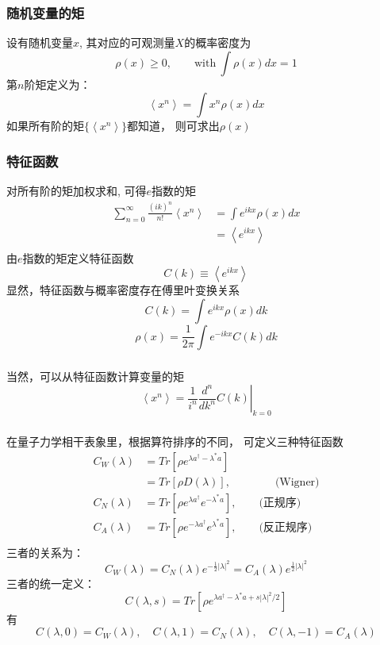   \begin{frame} 
  \frametitle{随机变量的矩}
      设有随机变量$x$, 其对应的可观测量$X$的概率密度为
      \[ \rho (x) \ge 0, \qquad \text{with} ~ \int \rho (x) dx =1\]
      第$n$阶矩定义为：
      \[ \left\langle x^n \right\rangle =  \int x^n \rho (x) dx \]
      如果所有阶的矩$\{\left\langle x^n \right\rangle \}$都知道， 则可求出$\rho (x)$
  \end{frame}

  \begin{frame} 
  \frametitle{特征函数}
     对所有阶的矩加权求和, 可得$e$指数的矩
     \[ \begin{aligned}
      \sum _{n=0} ^ \infty  \frac{(ik)^n}{n!} \left\langle x^n \right\rangle &= \int e^{ikx} \rho (x) dx\\
      &= \left\langle e^{ikx} \right\rangle\\
     \end{aligned}\] 
     由$e$指数的矩定义特征函数
     \[ C(k) \equiv \left\langle e^{ikx} \right\rangle\]
     显然，特征函数与概率密度存在傅里叶变换关系
     \[C (k) = \int e^{ikx} \rho (x) dk \]
     \[\rho (x) = \frac{1}{2 \pi}\int e^{-ikx} C (k) dk \]
  \end{frame}

  \begin{frame} 
  \frametitle{}
     当然，可以从特征函数计算变量的矩
     \[ \left\langle x^n \right\rangle = \left.\frac{1}{i^n} \frac{d^n }{d k^n} C(k)\right|_{k=0} \]
  \end{frame}

  \begin{frame} 
  \frametitle{}
     在量子力学相干表象里，根据算符排序的不同， 可定义三种特征函数
     \[ \begin{aligned}
      C_W (\lambda) & = Tr[\rho e^{\lambda a^{\dagger} -\lambda^* a}] \\ 
      &= Tr[\rho D(\lambda)], \qquad \qquad  \text{(Wigner)} \\
      C_N(\lambda) &= Tr[\rho e^{\lambda a^{\dagger}} e^{ -\lambda^* a}], \qquad  \text{(正规序)}\\
      C_A(\lambda) &= Tr[\rho e^{-\lambda a^{\dagger}} e^{ \lambda^* a}], \qquad  \text{(反正规序)}\\
     \end{aligned}\] 
     三者的关系为：
     \[  C_W (\lambda)  =  C_N(\lambda) e^{- \frac{1}{2}|\lambda|^2} = C_A(\lambda) e^{ \frac{1}{2}|\lambda|^2}\]
     三者的统一定义：
     \[  C(\lambda,s)= Tr[\rho e^{\lambda a^{\dagger} -\lambda^* a + s |\lambda|^2 /2}] \]
     有\[C(\lambda,0) = C_W (\lambda), \quad C(\lambda,1) = C_N (\lambda) , \quad C(\lambda,-1) = C_A (\lambda)\] 
  \end{frame}

